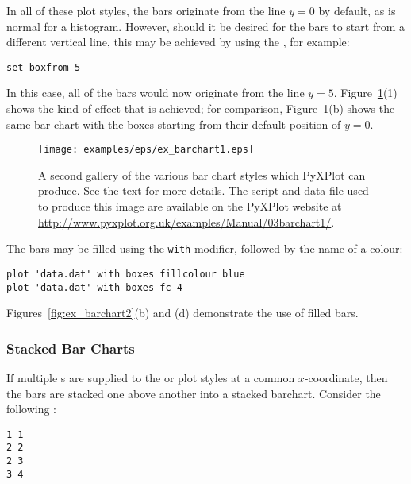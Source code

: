 In all of these plot styles, the bars originate from the line $y=0$ by default,
as is normal for a histogram. However, should it be desired for the bars to
start from a different vertical line, this may be achieved by using the
, for example:

\begin{verbatim}
set boxfrom 5
\end{verbatim}

\noindent In this case, all of the bars would now originate from the line
$y=5$. Figure~\ref{fig:ex_barchart1}(1) shows the kind of effect that is
achieved; for comparison, Figure~\ref{fig:ex_barchart1}(b) shows the same bar
chart with the boxes starting from their default position of $y=0$.

\begin{figure}
\begin{center}
\texttt{[image: examples/eps/ex\_barchart1.eps]}
\end{center}
\caption[A second gallery of the various bar chart styles which PyXPlot can
produce]
{A second gallery of the various bar chart styles which PyXPlot can
produce. See the text for more details.  The script and data file used to
produce this image are available on the PyXPlot website at
\protect\url{http://www.pyxplot.org.uk/examples/Manual/03barchart1/}.}
\label{fig:ex_barchart1}
\end{figure}

The bars may be filled using the {\tt with}  modifier,
followed by the name of a colour:

\begin{verbatim}
plot 'data.dat' with boxes fillcolour blue
plot 'data.dat' with boxes fc 4
\end{verbatim}

\noindent Figures~\ref{fig:ex_barchart2}(b) and (d) demonstrate the use of
filled bars.

\subsubsection{Stacked Bar Charts}

If multiple \datapoint s are supplied to the  or 
plot styles at a common $x$-coordinate, then the bars are stacked one above
another into a stacked barchart. Consider the following \datafile:

\begin{verbatim}
1 1
2 2
2 3
3 4
\end{verbatim}

